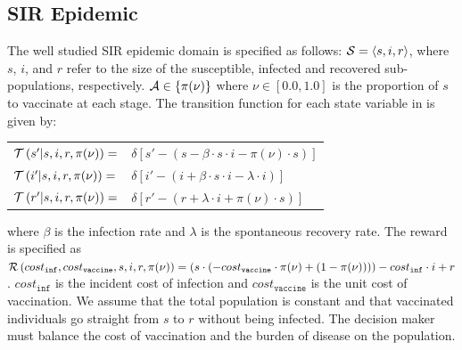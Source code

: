 \subsection{SIR Epidemic}
\label{sec:results_influenza}

The well studied SIR epidemic domain is specified as follows: {\footnotesize $ \mathcal{S} = \left\langle s, i, r \right\rangle$}, where $ s $, $ i $, and $ r $ refer to the size of the susceptible, infected and recovered sub-populations, respectively. {\footnotesize $ \mathcal{A} \in \left\lbrace \pi(\nu) \right\rbrace $} where {\footnotesize $\nu \in \left[0.0, 1.0\right]$} is the proportion of $ s $ to vaccinate at each stage. The transition function {\footnotesize \Transition} for each state variable in {\footnotesize \State} is given by:
    {\footnotesize 
        \abovedisplayskip=5pt
        \belowdisplayskip=0pt
        \renewcommand{\arraystretch}{1.5}
        \begin{tabular}{ll}
            $ \mathcal{T}\left( s' | s, i, r, \pi(\nu) \right) =$ & $ \delta \left[ s' - (s - \beta \cdot s \cdot i - \pi(\nu) \cdot s) \right] $ \\
            $ \mathcal{T}\left( i' | s, i, r, \pi(\nu) \right) =$ & $ \delta \left[ i' - (i + \beta \cdot s \cdot i - \lambda \cdot i) \right] $ \\
            $ \mathcal{T}\left( r' | s, i, r, \pi(\nu) \right) =$ & $ \delta \left[ r' - (r + \lambda \cdot i + \pi(\nu) \cdot s) \right] $ \\            
        \end{tabular}
    }%
where {\footnotesize $ \beta $} is the infection rate and {\footnotesize $\lambda$} is the spontaneous recovery rate. The reward is specified as {\footnotesize $ \mathcal{R}\left(cost_{\mathtt{inf}}, cost_{\mathtt{vaccine}}, s, i, r, \pi(\nu) \right) = (s \cdot (-cost_{\mathtt{vaccine}} \cdot \pi(\nu) + (1 - \pi(\nu)))) - cost_{\mathtt{inf}} \cdot i + r$}. {\footnotesize $ cost_{\mathtt{inf}} $} is the incident cost of infection and {\footnotesize $ cost_{\mathtt{vaccine}} $} is the unit cost of vaccination. We assume that the total population is constant and that vaccinated individuals go straight from {\footnotesize $ s $} to {\footnotesize $ r $} without being infected. The decision maker must balance the cost of vaccination and the burden of disease on the population. 

